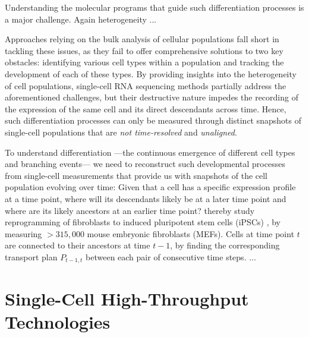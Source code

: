 Understanding the molecular programs that guide such differentiation processes is a major challenge.
Again heterogeneity ...


Approaches relying on the bulk analysis of cellular populations fall short in tackling these issues, as they fail to offer comprehensive solutions to two key obstacles: identifying various cell types within a population and tracking the development of each of these types.
By providing insights into the heterogeneity of cell populations, single-cell RNA sequencing methods partially address the aforementioned challenges, but their destructive nature impedes the recording of the expression of the same cell and its direct descendants across time.
Hence, such differentiation processes can only be measured through distinct snapshots of single-cell populations that are \textit{not time-resolved} and \textit{unaligned}.

To understand differentiation ---the continuous emergence of different cell types and branching events--- we need to reconstruct such developmental processes from single-cell measurements that provide us with snapshots of the cell population evolving over time:
Given that a cell has a specific expression profile at a time point, where will its descendants likely be at a later time point and where are its likely ancestors at an earlier time point? 
\citet{schiebinger2019optimal} thereby study reprogramming of fibroblasts to induced pluripotent stem cells (iPSCs) \citep{}, by measuring $>315,000$ mouse embryonic fibroblasts (MEFs). Cells at time point $t$ are connected to their ancestors at time $t-1$, by finding the corresponding transport plan $P_{t-1,t}$ between each pair of consecutive time steps.
...


\section{Single-Cell High-Throughput Technologies}
\label{sec:tech_background}

